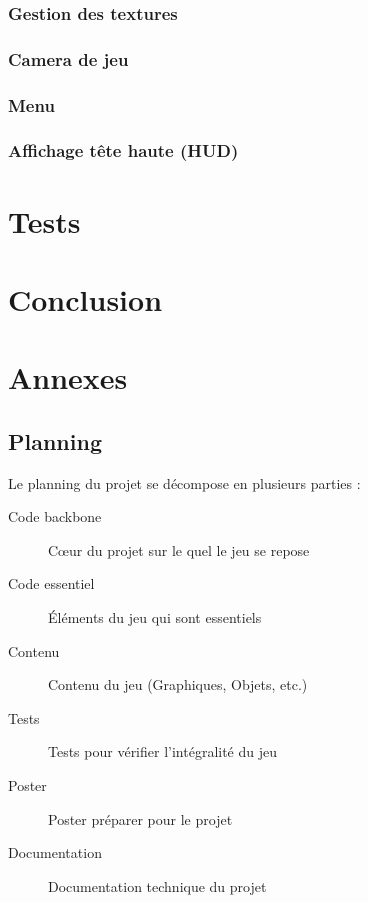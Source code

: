 \documentclass[11pt, a4paper, oneside]{report}
\begin{document}
\subsection{Gestion des textures}
\label{subsec:texturemanager}
\subsection{Camera de jeu}
\subsection{Menu}
\subsection{Affichage tête haute (HUD)}
\newpage
\chapter{Tests}

\newpage
\chapter{Conclusion}

\newpage
\chapter{Annexes}
\section{Planning}
Le planning du projet se décompose en plusieurs parties :\\
\begin{description}
	\item[Code backbone] Cœur du projet sur le quel le jeu se repose
	\item[Code essentiel] Éléments du jeu qui sont essentiels
	\item[Contenu] Contenu du jeu (Graphiques, Objets, etc.)
	\item[Tests] Tests pour vérifier l'intégralité du jeu
	\item[Poster] Poster préparer pour le projet
	\item[Documentation] Documentation technique du projet
\end{description}
\end{document}
